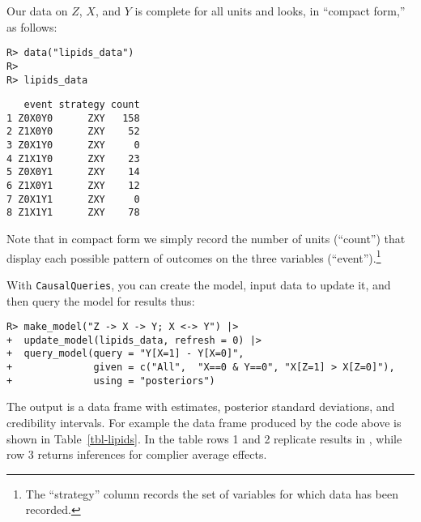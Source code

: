 \documentclass[
  11pt,
  article]{jss}
\begin{document}
Our data on \(Z\), \(X\), and \(Y\) is complete for all units and looks,
in ``compact form,'' as follows:

\begin{verbatim}
R> data("lipids_data")
R> 
R> lipids_data
\end{verbatim}

\begin{verbatim}
   event strategy count
1 Z0X0Y0      ZXY   158
2 Z1X0Y0      ZXY    52
3 Z0X1Y0      ZXY     0
4 Z1X1Y0      ZXY    23
5 Z0X0Y1      ZXY    14
6 Z1X0Y1      ZXY    12
7 Z0X1Y1      ZXY     0
8 Z1X1Y1      ZXY    78
\end{verbatim}

Note that in compact form we simply record the number of units
(``count'') that display each possible pattern of outcomes on the three
variables (``event'').\footnote{The ``strategy'' column records the set
  of variables for which data has been recorded.}

With \texttt{CausalQueries}, you can create the model, input data to
update it, and then query the model for results thus:

\begin{verbatim}
R> make_model("Z -> X -> Y; X <-> Y") |>
+  update_model(lipids_data, refresh = 0) |>
+  query_model(query = "Y[X=1] - Y[X=0]",
+              given = c("All",  "X==0 & Y==0", "X[Z=1] > X[Z=0]"),
+              using = "posteriors") 
\end{verbatim}

\hypertarget{tbl-lipids}{}
\begin{table}
\caption{\label{tbl-lipids}Replication of \citet{chickering_clinicians_1996}. }\tabularnewline

\centering
{}
\end{table}

The output is a data frame with estimates, posterior standard
deviations, and credibility intervals. For example the data frame
produced by the code above is shown in Table~\ref{tbl-lipids}. In the
table rows 1 and 2 replicate results in
\citet{chickering_clinicians_1996}, while row 3 returns inferences for
complier average effects.
\end{document}
